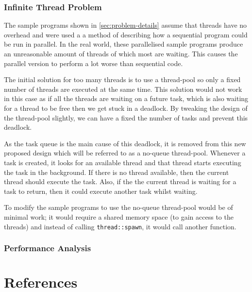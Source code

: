 \documentclass[conference]{IEEEtran}
\begin{document}
\subsubsection{Infinite Thread Problem}
The sample programs shown in \autoref{sec:problem-details} assume that threads have no overhead and were used a a method of describing how a sequential program could be run in parallel. In the real world, these parallelised sample programs produce an unreasonable amount of threads of which most are waiting. This causes the parallel version to perform a lot worse than sequential code.

The initial solution for too many threads is to use a thread-pool so only a fixed number of threads are executed at the same time. This solution would not work in this case as if all the threads are waiting on a future task, which is also waiting for a thread to be free then we get stuck in a deadlock. By tweaking the design of the thread-pool slightly, we can have a fixed the number of tasks and prevent this deadlock.

As the task queue is the main cause of this deadlock, it is removed from this new proposed design which will be referred to as a no-queue thread-pool. Whenever a task is created, it looks for an available thread and that thread starts executing the task in the background. If there is no thread available, then the current thread should execute the task. Also, if the the current thread is waiting for a task to return, then it could execute another task whilst waiting.  

To modify the sample programs to use the no-queue thread-pool would be of minimal work; it would require a shared memory space (to gain access to the threads) and instead of calling \texttt{thread::spawn}, it would call another function.

\subsubsection{Performance Analysis}

\section{References}
\printbibliography[heading=none]
\end{document}
